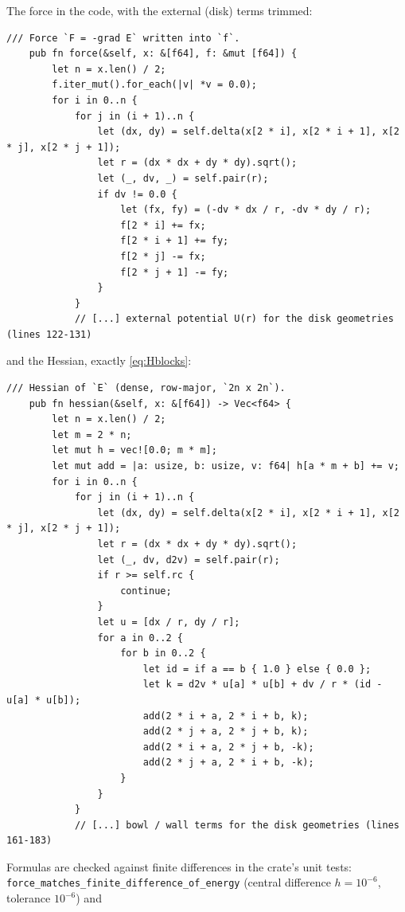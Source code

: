 The force in the code, with the external (disk) terms trimmed:
\begin{lstlisting}[language={},title={lib.rs, lines 105--121 (external-potential part trimmed)}]
    /// Force `F = -grad E` written into `f`.
    pub fn force(&self, x: &[f64], f: &mut [f64]) {
        let n = x.len() / 2;
        f.iter_mut().for_each(|v| *v = 0.0);
        for i in 0..n {
            for j in (i + 1)..n {
                let (dx, dy) = self.delta(x[2 * i], x[2 * i + 1], x[2 * j], x[2 * j + 1]);
                let r = (dx * dx + dy * dy).sqrt();
                let (_, dv, _) = self.pair(r);
                if dv != 0.0 {
                    let (fx, fy) = (-dv * dx / r, -dv * dy / r);
                    f[2 * i] += fx;
                    f[2 * i + 1] += fy;
                    f[2 * j] -= fx;
                    f[2 * j + 1] -= fy;
                }
            }
            // [...] external potential U(r) for the disk geometries (lines 122-131)
\end{lstlisting}
and the Hessian, exactly \eqref{eq:Hblocks}:
\begin{lstlisting}[language={},title={lib.rs, lines 135--160 (external-potential part trimmed)}]
    /// Hessian of `E` (dense, row-major, `2n x 2n`).
    pub fn hessian(&self, x: &[f64]) -> Vec<f64> {
        let n = x.len() / 2;
        let m = 2 * n;
        let mut h = vec![0.0; m * m];
        let mut add = |a: usize, b: usize, v: f64| h[a * m + b] += v;
        for i in 0..n {
            for j in (i + 1)..n {
                let (dx, dy) = self.delta(x[2 * i], x[2 * i + 1], x[2 * j], x[2 * j + 1]);
                let r = (dx * dx + dy * dy).sqrt();
                let (_, dv, d2v) = self.pair(r);
                if r >= self.rc {
                    continue;
                }
                let u = [dx / r, dy / r];
                for a in 0..2 {
                    for b in 0..2 {
                        let id = if a == b { 1.0 } else { 0.0 };
                        let k = d2v * u[a] * u[b] + dv / r * (id - u[a] * u[b]);
                        add(2 * i + a, 2 * i + b, k);
                        add(2 * j + a, 2 * j + b, k);
                        add(2 * i + a, 2 * j + b, -k);
                        add(2 * j + a, 2 * i + b, -k);
                    }
                }
            }
            // [...] bowl / wall terms for the disk geometries (lines 161-183)
\end{lstlisting}
Formulas are checked against finite differences in the crate's unit tests:
\texttt{force\_\allowbreak matches\_\allowbreak finite\_\allowbreak difference\_\allowbreak of\_\allowbreak energy} (central difference $h=10^{-6}$, tolerance $10^{-6}$) and
